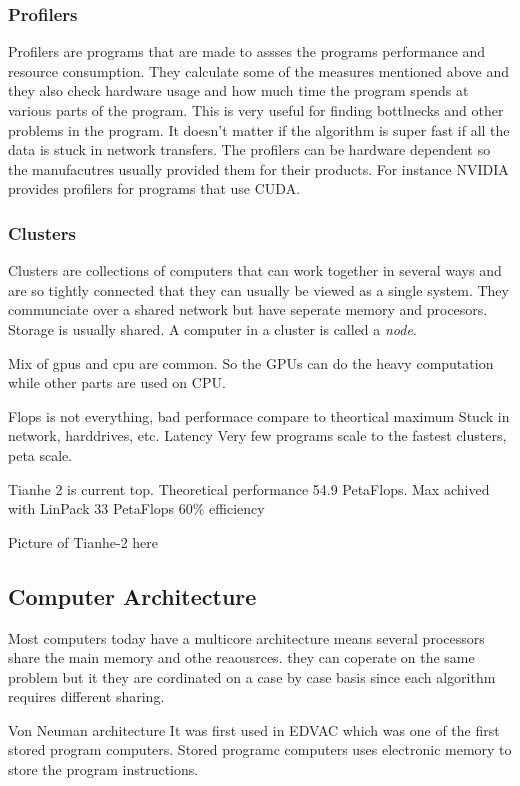 \documentclass[10pt,a4paper]{article}
\begin{document}
\subsubsection{Profilers}
Profilers are programs that are made to assses the programs performance and resource consumption. They calculate some of the measures mentioned above and they also check hardware usage and how much time the program spends at various parts of the program. This is very useful for finding bottlnecks and other problems in the program. It doesn't matter if the algorithm is super fast if all the data is stuck in network transfers. The profilers can be hardware dependent so the manufacutres usually provided them for their products. For instance NVIDIA provides profilers for programs that use CUDA.

\subsubsection{Clusters}
Clusters are collections of computers that can work together in several ways and are so tightly connected that they can usually be viewed as a single system. They communciate over a shared network but have seperate memory and procesors. Storage is usually shared. A computer in a cluster is called a \emph{node}. \cite{intro_hpc}

Mix of gpus and cpu are common. So the GPUs can do the heavy computation while other parts are used on CPU.

Flops is not everything, bad performace compare to theortical maximum
Stuck in network, harddrives, etc. Latency
Very few programs scale to the fastest clusters, peta scale.

Tianhe 2 is current top. Theoretical performance 54.9 PetaFlops.\cite{TOP500}
Max achived with LinPack 33 PetaFlops
60\% efficiency

Picture of Tianhe-2 here

\clearpage
\subsection{Computer Architecture}

Most computers today have a multicore architecture
means several processors share the main memory and othe reaousrces. they can coperate on the same problem but it they are cordinated on a case by case basis since each algorithm requires different sharing.

Von Neuman architecture
It was first used in EDVAC which was one of the first stored program computers\cite{von1993first}. Stored programc computers uses electronic memory to store the program instructions\cite{computer_arch_2003}.
\end{document}
